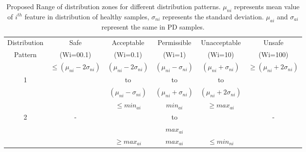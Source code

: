 \documentclass{IEEEtran}
\begin{document}
\begin{table}[htb]
\caption{Proposed Range of distribution zones for different distribution patterns. $\mu_{ni}$ represents mean value of $i^{th}$ feature in distribution of healthy samples, $\sigma_{ni}$ represents the standard deviation. $\mu_{ai}$ and $\sigma_{ai}$  represent the same in PD samples.}
	\centering
		\begin{tabular} {c c c c c c }\hline
				 			
				Distribution  & Safe & Acceptable & Permissible & Unacceptable & Unsafe\\ 
				Pattern & (Wi=00.1) & (Wi=0.1) & (Wi=1) & (Wi=10) & (Wi=100)\\ \hline
				 & $\leq(\mu_{ni} - 2\sigma_{ni})$ & $(\mu_{ni} - 2\sigma_{ni})$ & $(\mu_{ni} - \sigma_{ni})$ & $(\mu_{ni} + \sigma_{ni})$ & $\geq (\mu_{ni} + 2\sigma_{ni})$ \\
				1 &               & to           & to          & to          & \\
				 &                & $(\mu_{ni} - \sigma_{ni})$  & $(\mu_{ni} + \sigma_{ni})$ & $(\mu_{ni} + 2\sigma_{ni})$ & \\ \hline
				
  &                & $\leq min_{ai}$ & $ min_{ai}$ & $\geq max_{ai}$ &  \\
2 &        -       &                  &to           &                  & - \\
	&                &                 & $max_{ai}$ &                   & \\ 

	 &   & $\geq max_{ai}$  &  $max_{ai}$      & $\leq min_{ni} $ & \\ \hline 
			
		\end{tabular}
	
	\label{table3}
\end{table}
	
		
		
		
		
		
		
\end{document}
